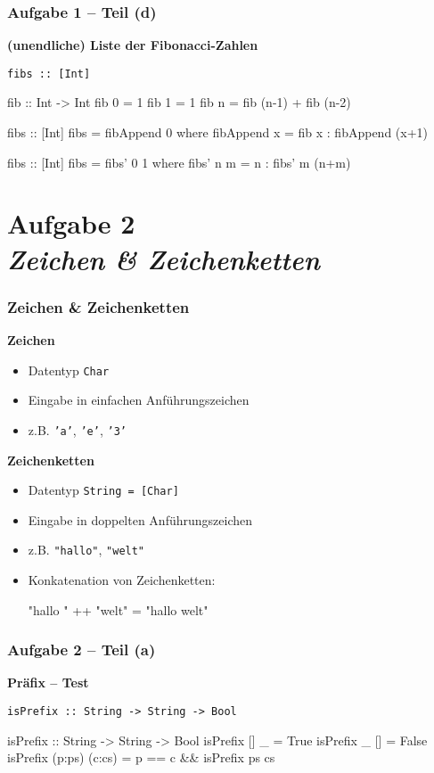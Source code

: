 \documentclass{beamer}
\begin{document}
\begin{frame}[t, fragile] \frametitle{Aufgabe 1 -- Teil (d)}
	\small
	\textbf{(unendliche) Liste der Fibonacci-Zahlen}
	
	\texttt{fibs :: [Int]}
	
	\pause \bigskip
	\begin{codebox}
fib :: Int -> Int
fib 0 = 1
fib 1 = 1
fib n = fib (n-1) + fib (n-2)

fibs :: [Int]
fibs = fibAppend 0
	where fibAppend x = fib x : fibAppend (x+1)
	\end{codebox}
	\pause
	\begin{codebox}
fibs :: [Int]
fibs = fibs' 0 1
	where fibs' n m = n : fibs' m (n+m)
	\end{codebox}
\end{frame}


\section{Aufgabe 2 \\ \textit{\normalsize Zeichen \& Zeichenketten}}

	\begin{frame}[fragile] \frametitle{Zeichen \& Zeichenketten}
		\textbf{Zeichen}
		\begin{itemize}
			\item Datentyp \texttt{Char}
			\item Eingabe in einfachen Anführungszeichen
			\item z.B. \texttt{'a'}, \texttt{'e'}, \texttt{'3'}
		\end{itemize}
		\pause
		\textbf{Zeichenketten}
		\begin{itemize}
			\item Datentyp \texttt{String = [Char]}
			\item Eingabe in doppelten Anführungszeichen
			\item z.B. \texttt{"hallo"}, \texttt{"welt"}
			\item Konkatenation von Zeichenketten: \\[6pt] 
			\begin{codebox}
"hallo " ++ "welt" = "hallo welt"
			\end{codebox}
		\end{itemize}
	\end{frame}

\begin{frame}[t, fragile] \frametitle{Aufgabe 2 -- Teil (a)}
	\textbf{Präfix -- Test}
	
	\texttt{isPrefix :: String -> String -> Bool}
	
	\pause \bigskip
	
	\begin{codebox}
isPrefix :: String -> String -> Bool
isPrefix [] _ = True
isPrefix _ [] = False
isPrefix (p:ps) (c:cs) = p == c && isPrefix ps cs
	\end{codebox}
\end{frame}
\end{document}
